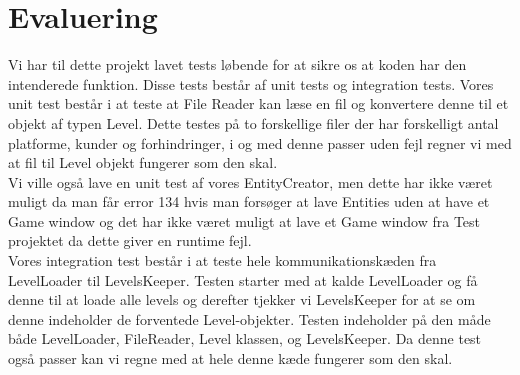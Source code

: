 \section{Evaluering}
Vi har til dette projekt lavet tests løbende for at sikre os at koden har den intenderede funktion. Disse tests består af unit tests og integration tests. Vores unit test består i at teste at File Reader kan læse en fil og konvertere denne til et objekt af typen Level. Dette testes på to forskellige filer der har forskelligt antal platforme, kunder og forhindringer, i og med denne passer uden fejl regner vi med at fil til Level objekt fungerer som den skal.\\
Vi ville også lave en unit test af vores EntityCreator, men dette har ikke været muligt da man får error 134 hvis man forsøger at lave Entities uden at have et Game window og det har ikke været muligt at lave et Game window fra Test projektet da dette giver en runtime fejl.\\
Vores integration test består i at teste hele kommunikationskæden fra LevelLoader til LevelsKeeper. Testen starter med at kalde LevelLoader og få denne til at loade alle levels og derefter tjekker vi LevelsKeeper for at se om denne indeholder de forventede Level-objekter. Testen indeholder på den måde både LevelLoader, FileReader, Level klassen, og LevelsKeeper. Da denne test også passer kan vi regne med at hele denne kæde fungerer som den skal.
